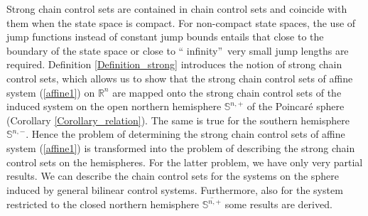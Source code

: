 \documentclass[preprint,12pt]{elsarticle}
\begin{document}
Strong chain control sets are contained in chain control sets and coincide
with them when the state space is compact. For non-compact state spaces, the
use of jump functions instead of constant jump bounds entails that close to
the boundary of the state space or close to \textquotedblleft
infinity\textquotedblright\ very small jump lengths are required. Definition
\ref{Definition_strong} introduces the notion of strong chain control sets,
which allows us to show that the strong chain control sets of affine system
(\ref{affine1}) on $\mathbb{R}^{n}$ are mapped onto the strong chain control
sets of the induced system on the open northern hemisphere $\mathbb{S}^{n,+}$
of the Poincar\'{e} sphere (Corollary \ref{Corollary_relation}). The same is
true for the southern hemisphere $\mathbb{S}^{n,-}$. Hence the problem of
determining the strong chain control sets of affine system (\ref{affine1}) is
transformed into the problem of describing the strong chain control sets on
the hemispheres. For the latter problem, we have only very partial results. We
can describe the chain control sets for the systems on the sphere induced by
general bilinear control systems. Furthermore, also for the system restricted
to the closed northern hemisphere $\overline{\mathbb{S}^{n,+}}$ some results
are derived.
\end{document}
